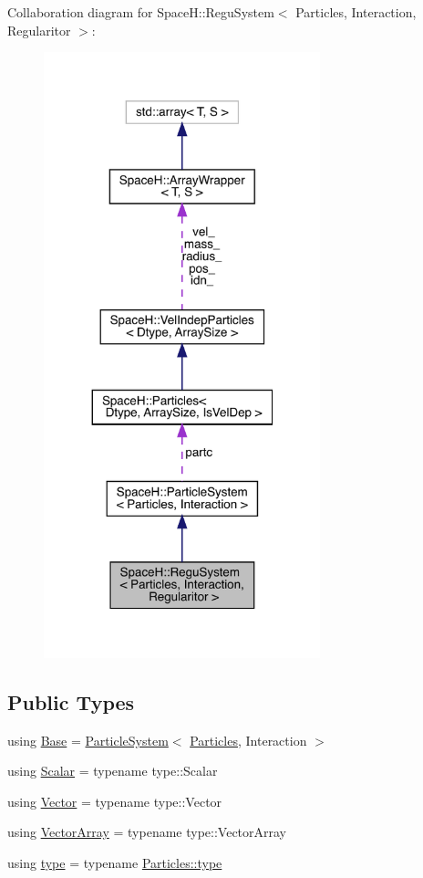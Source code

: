 Collaboration diagram for SpaceH\+:\+:Regu\+System$<$ Particles, Interaction, Regularitor $>$\+:
\nopagebreak
\begin{figure}[H]
\begin{center}
\leavevmode
\includegraphics[width=227pt]{class_space_h_1_1_regu_system__coll__graph}
\end{center}
\end{figure}
\subsection*{Public Types}
\begin{DoxyCompactItemize}
\item 
using \mbox{\hyperlink{class_space_h_1_1_regu_system_ad65166badb7cec65669212f7b61489a6}{Base}} = \mbox{\hyperlink{class_space_h_1_1_particle_system}{Particle\+System}}$<$ \mbox{\hyperlink{struct_space_h_1_1_particles}{Particles}}, Interaction $>$
\item 
using \mbox{\hyperlink{class_space_h_1_1_regu_system_a6f6c4d4fd030a85621a78b137c0ac889}{Scalar}} = typename type\+::\+Scalar
\item 
using \mbox{\hyperlink{class_space_h_1_1_regu_system_a26cc9ed7fee2c1b376993fe6ca010190}{Vector}} = typename type\+::\+Vector
\item 
using \mbox{\hyperlink{class_space_h_1_1_regu_system_a506e965b0be781a4143b1f2311f98da9}{Vector\+Array}} = typename type\+::\+Vector\+Array
\item 
using \mbox{\hyperlink{class_space_h_1_1_regu_system_a21376735739dfbe668a70cdba008baa3}{type}} = typename \mbox{\hyperlink{class_space_h_1_1_vel_indep_particles_a09aa167b5fb1b203ab021220601ed74c}{Particles\+::type}}
\end{DoxyCompactItemize}
